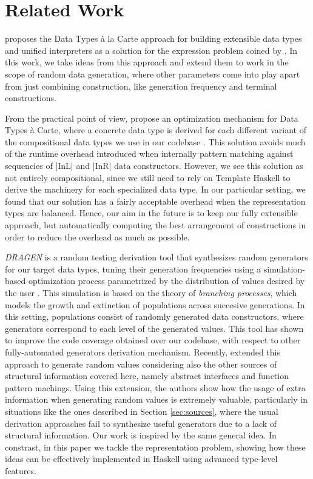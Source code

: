 \section{Related Work}
\label{sec:related}

\citeauthor{SwierstraDTC} \cite{SwierstraDTC} proposes the Data Types \`a la
Carte approach for building extensible data types and unified interpreters as a
solution for the expression problem coined by \citeauthor{wadler1998expression}
\cite{wadler1998expression}.
%
In this work, we take ideas from this approach and extend them to work in the
scope of random data generation, where other parameters come into play apart
from just combining construction, like generation frequency and terminal
constructions.


From the practical point of view, \citeauthor{KiriyamaOptimizingDTC} propose an
optimization mechanism for Data Types \`a Carte, where a concrete data type is
derived for each different variant of the compositional data types we use in our
codebase \cite{KiriyamaOptimizingDTC}.
%
This solution avoids much of the runtime overhead introduced when internally
pattern matching against sequencies of |InL| and |InR| data constructors.
%
However, we see this solution as not entirely compositional, since we still need
to rely on Template Haskell to derive the machinery for each specialized data
type.
%
In our particular setting, we found that our solution has a fairly acceptable
overhead when the representation types are balanced.
%
Hence, our aim in the future is to keep our fully extensible approach, but
automatically computing the best arrangement of constructions in order to reduce
the overhead as much as possible.


\emph{DRAGEN} is a random testing derivation tool that synthesizes random
generators for our target data types, tuning their generation frequencies using
a simulation-based optimization process parametrized by the distribution of
values desired by the user \cite{DBLP:conf/haskell/MistaRH18}.
%
This simulation is based on the theory of \emph{branching processes}, which
models the growth and extinction of populations across succesive generations.
%
In this setting, populations consist of randomly generated data constructors,
where generators correspond to each level of the generated values.
%
This tool has shown to improve the code coverage obtained over our codebase,
with respect to other fully-automated generators derivation mechanism.
%
Recently, \citeauthor{Mista2019GeneratingRS} extended this approach to generate
random values considering also the other sources of structural information
covered here, namely abstract interfaces and function pattern machings.
%
Using this extension, the authors show how the usage of extra information when
generating random values is extremely valuable, particularly in situations like
the ones described in Section \ref{sec:sources}, where the usual derivation
approaches fail to synthesize useful generators due to a lack of structural
information.
%
Our work is inspired by the same general idea. In constrast, in this paper we
tackle the representation problem, showing how these ideas can be effectively
implemented in Haskell using advanced type-level features.

